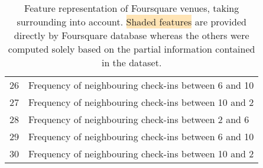 \begin{table}[hb]
\begin{tabularx}{\textwidth}{lX}
	26 & Frequency of neighbouring check-ins between 6 \am{} and 10 \am{} \\
	27 & Frequency of neighbouring check-ins between 10 \am{} and 2 \hpm{} \\
	28 & Frequency of neighbouring check-ins between 2 \hpm{} and 6 \hpm{} \\
	29 & Frequency of neighbouring check-ins between 6 \hpm{} and 10 \hpm{} \\
	30 & Frequency of neighbouring check-ins between 10 \hpm{} and 2 \am{} \\
        \bottomrule
    \end{tabularx}
    \caption[Venue features]{Feature representation of Foursquare venues,
	    taking surrounding into account. \colorbox{Moccasin}{Shaded
	    features} are provided directly by Foursquare database whereas the
	    others were computed solely based on the partial information
	    contained in the dataset.\label{tab:venuefeatures}}
\end{table}
